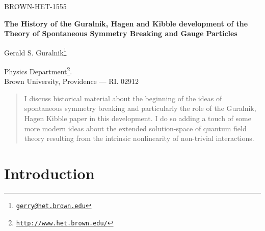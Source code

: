\documentclass[12pt]{article}
\begin{document}
%
\begin{titlepage}
  \begin{flushright}
    {BROWN-HET-1555}
 \end{flushright}
  \bigskip

  \begin{center}
    {\LARGE \textbf{\textsf{The History of the Guralnik, Hagen and Kibble development of the Theory of
          Spontaneous Symmetry Breaking and Gauge Particles}}} \\
    \bigskip

    {\Large \textsf{Gerald S.
        Guralnik\footnote{\href{mailto:gerry@het.brown.edu}{\texttt{gerry@het.brown.edu}}}}} \\
    \bigskip

    \textsf{Physics
      Department\footnote{\href{http://www.het.brown.edu/}{\texttt{http://www.het.brown.edu/}}}.}\\
    \textsf{Brown University, Providence --- RI. 02912}
    \date{\today}
  \end{center}
  \bigskip

\begin{abstract} \noindent I discuss historical material about the beginning
  of the ideas of spontaneous symmetry breaking and
  particularly the role of the Guralnik, Hagen Kibble paper in this development.
 I do so adding a touch of some more modern ideas about the
  extended solution-space of quantum field theory resulting from the intrinsic
  nonlinearity of non-trivial interactions.
\end{abstract}

\newpage
  \tableofcontents
\end{titlepage}
%
\section{Introduction} \label{sec:0}
\end{document}
